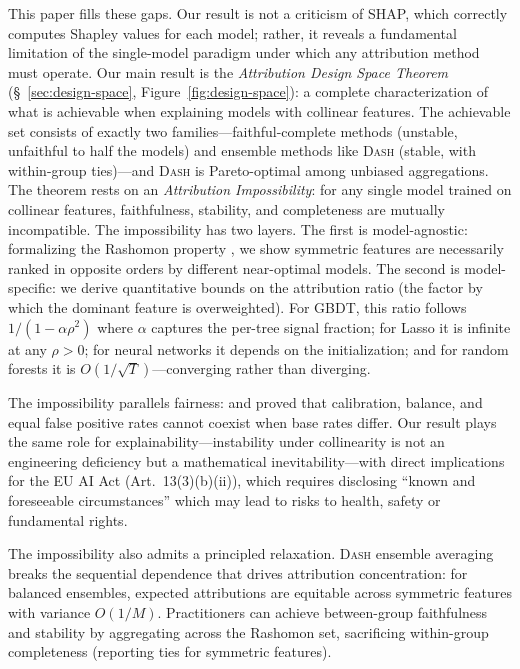 \documentclass{jmlr}
\newcommand{\DASH}{\textsc{Dash}}
\newcommand{\GBDT}{\textsc{GBDT}}
\begin{document}
This paper fills these gaps. Our result is not a criticism of SHAP, which correctly computes Shapley values for each model; rather, it reveals a fundamental limitation of the single-model paradigm under which any attribution method must operate.
Our main result is the \emph{Attribution Design Space Theorem} (\S~\ref{sec:design-space}, Figure~\ref{fig:design-space}): a complete characterization of what is achievable when explaining models with collinear features.
The achievable set consists of exactly two families---faithful-complete methods (unstable, unfaithful to half the models) and ensemble methods like \DASH{} (stable, with within-group ties)---and \DASH{} is Pareto-optimal among unbiased aggregations.
The theorem rests on an \emph{Attribution Impossibility}: for any single model trained on collinear features, faithfulness, stability, and completeness are mutually incompatible.
The impossibility has two layers.
The first is model-agnostic: formalizing the Rashomon property \citep{rudin2024amazing}, we show symmetric features are necessarily ranked in opposite orders by different near-optimal models.
The second is model-specific: we derive quantitative bounds on the attribution ratio (the factor by which the dominant feature is overweighted).
For \GBDT{}, this ratio follows $1/(1-\alpha\rho^2)$ where $\alpha$ captures the per-tree signal fraction; for Lasso it is infinite at any $\rho > 0$; for neural networks it depends on the initialization; and for random forests it is $O(1/\sqrt{T})$---converging rather than diverging.

The impossibility parallels fairness: \citet{chouldechova2017fair} and \citet{kleinberg2017inherent} proved that calibration, balance, and equal false positive rates cannot coexist when base rates differ.
Our result plays the same role for explainability---instability under collinearity is not an engineering deficiency but a mathematical inevitability---with direct implications for the EU AI Act \citep{euaiact2024} (Art.~13(3)(b)(ii)), which requires disclosing ``known and foreseeable circumstances'' which may lead to risks to health, safety or fundamental rights.

The impossibility also admits a principled relaxation.
\DASH{} ensemble averaging breaks the sequential dependence that drives attribution concentration: for balanced ensembles, expected attributions are equitable across symmetric features with variance $O(1/M)$.
Practitioners can achieve between-group faithfulness and stability by aggregating across the Rashomon set, sacrificing within-group completeness (reporting ties for symmetric features).
\end{document}
